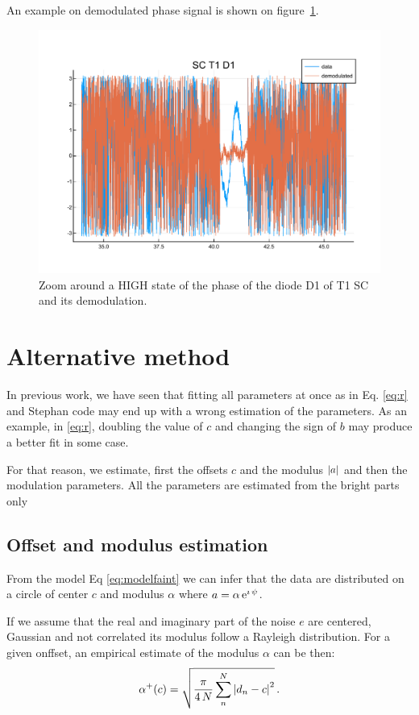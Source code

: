 \documentclass[a4paper,11pt,twoside]{scrartcl}
\begin{document}
An example on demodulated phase signal is shown on figure~\ref{fig:FaintDemodulated}.
\begin{figure}
    \centering
    \includegraphics[width=0.8\linewidth]{figs/FaintDemodulated.pdf}
    \caption{Zoom around a HIGH state of the phase of the diode D1 of T1 SC and its demodulation.}
    \label{fig:FaintDemodulated}
\end{figure}


\section{Alternative method}
In previous work, we have seen that fitting  all parameters at once as in Eq. \ref{eq:r} and Stephan code may end up with a wrong estimation of the parameters. As an example, in \ref{eq:r}, doubling the value of $c$ and changing the sign of $b$ may produce a better fit in some case.

For that reason, we estimate, first the offsets $c$ and the modulus $\vert a\vert$ and then the modulation parameters. All the parameters are estimated from the bright parts only


\subsection{Offset and modulus estimation}
From the model Eq \ref{eq:modelfaint} we can infer that the data are distributed on a circle of center $c$ and modulus $\alpha$ where $a = \alpha\, \mathrm{e}^{\imath\,\psi}$.

If we assume that the real and imaginary part of the noise $e$ are centered, Gaussian and not correlated its modulus follow a Rayleigh distribution. For a given onffset, an empirical estimate of the modulus $\alpha$  can be then:
\begin{equation}\label{eq:Rayleigh}
    \alpha^+(c) = \sqrt{\frac{\pi}{4\,N}\sum^N_n \left\vert d_n -c\right\vert^2}\,.
\end{equation}
\end{document}
